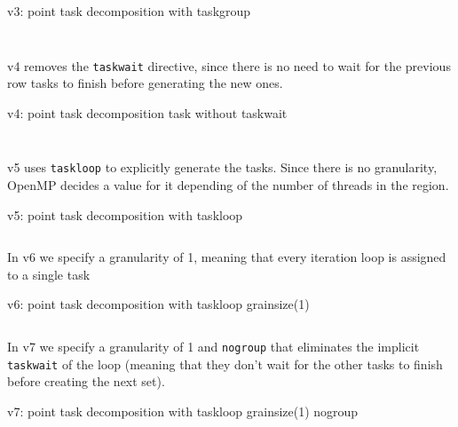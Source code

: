 \begin{listing}[H]
    \centering
    \caption{v3: point task decomposition with taskgroup}
    \inputminted[firstline=91,lastline=98]{c}{sources/mandel-omp-v3.c}
    \vspace{-2em}
    \inputminted[firstline=133,lastline=135]{c}{sources/mandel-omp-v3.c}
    \label{lst:v3} 
\end{listing}

v4 removes the \texttt{taskwait} directive, since there is no need to wait for the previous row tasks
to finish before generating the new ones.

\begin{listing}[H]
    \centering
    \caption{v4: point task decomposition task without taskwait}
    \inputminted[firstline=91,lastline=98]{c}{sources/mandel-omp-v4.c}
    \vspace{-2em}
    \inputminted[firstline=131,lastline=133]{c}{sources/mandel-omp-v4.c}
    \label{lst:v4} 
\end{listing}

v5 uses \texttt{taskloop} to explicitly generate the tasks. Since there is no granularity, OpenMP
decides a value for it depending of the number of threads in the region.

\begin{listing}[H]
    \centering
    \caption{v5: point task decomposition with taskloop}
    \inputminted[firstline=91,lastline=98]{c}{sources/mandel-omp-v5.c}
    \label{lst:v5} 
\end{listing}

In v6 we specify a granularity of 1, meaning that every iteration loop is assigned to a single task

\begin{listing}[H]
    \centering
    \caption{v6: point task decomposition with taskloop grainsize(1)}
    \inputminted[firstline=91,lastline=98]{c}{sources/mandel-omp-v6.c}
    \label{lst:v6} 
\end{listing}

In v7 we specify a granularity of 1 and \texttt{nogroup} that eliminates the implicit \texttt{taskwait}
of the loop (meaning that they don't wait for the other tasks to finish before creating the next set).

\begin{listing}[H]
    \centering
    \caption{v7: point task decomposition with taskloop grainsize(1) nogroup}
    \inputminted[firstline=91,lastline=98]{c}{sources/mandel-omp-v7.c}
    \label{lst:v7} 
\end{listing}

